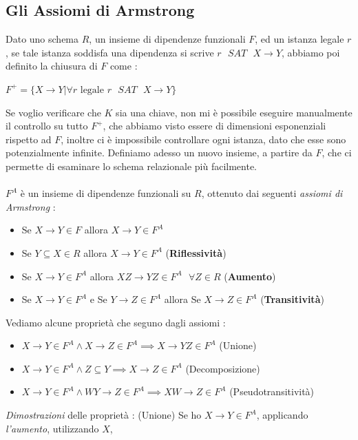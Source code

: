 \documentclass[12pt, letterpaper]{article}
\begin{document}
\subsection{Gli Assiomi di Armstrong}
Dato uno schema \(R\), un insieme di dipendenze funzionali \(F\), ed un istanza legale \(r\), se tale 
istanza soddisfa una dipendenza si scrive \(r \text{ }SAT \text{ } X\rightarrow Y\), abbiamo poi definito la chiusura 
di \(F\) come : \begin{center}
    \( F^+ = \{X\rightarrow Y | \forall r \text{ legale }r\text{ }SAT \text{ } X\rightarrow Y\}\)
\end{center}
Se voglio verificare che \(K\) sia una chiave, non mi è possibile eseguire manualmente il controllo su 
tutto \(F^+\), che abbiamo visto essere di dimensioni esponenziali rispetto ad \(F\), inoltre ci è impossibile 
controllare ogni istanza, dato che esse sono potenzialmente infinite. Definiamo adesso un nuovo insieme, a partire da 
\(F\), che ci permette di esaminare lo schema relazionale più facilmente. 
\\\hphantom{}\\
    \(F^A\) è un insieme di dipendenze funzionali su \(R\), ottenuto dai seguenti \textit{assiomi di Armstrong} :\begin{itemize}
        \item Se \(X\rightarrow Y \in F\) allora \(X\rightarrow Y \in F^A\)
        \item Se \(Y\subseteq X\in R\) allora \(X\rightarrow Y \in F^A\) (\textbf{Riflessività})
        \item Se \(X\rightarrow Y \in F^A\) allora \(XZ\rightarrow YZ \in F^A\text{ }\forall Z\in R\) (\textbf{Aumento})
        \item Se \(X\rightarrow Y \in F^A\) e Se \(Y\rightarrow Z \in F^A\) allora Se \(X\rightarrow Z \in F^A\) (\textbf{Transitività})
    \end{itemize} 
Vediamo alcune proprietà che seguno dagli assiomi :
\begin{itemize}
    \item \(X\rightarrow Y \in F^A\land X\rightarrow Z \in F^A \implies X\rightarrow YZ\in F^A\) (Unione)
    \item \(X\rightarrow Y \in F^A\land Z\subseteq Y \implies X\rightarrow Z \in F^A\) (Decomposizione)
    \item \(X\rightarrow Y \in F^A\land WY\rightarrow Z\in F^A \implies XW\rightarrow Z \in F^A\) (Pseudotransitività)
\end{itemize}
\textit{Dimostrazioni} delle proprietà : (Unione) Se ho \(X\rightarrow Y\in F^A\), applicando \textit{l'aumento}, utilizzando \(X\), 
\end{document}
